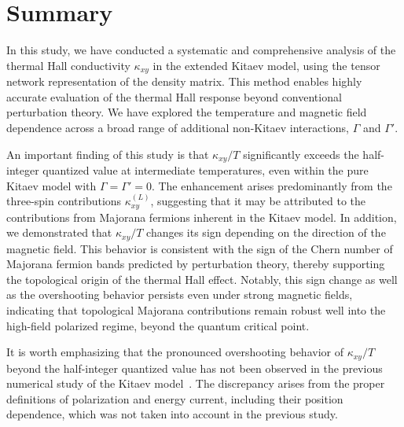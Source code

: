 \documentclass[twocolumn,superscriptaddress,showpacs, longbibliography, aps, prx]{revtex4-2}
\begin{document}
\section{Summary}
\label{sec:Summary}
In this study, we have conducted a systematic and comprehensive analysis of the thermal Hall conductivity $\kappa_{xy}$ in the extended Kitaev model, using the tensor network representation of the density matrix. 
This method enables highly accurate evaluation of the thermal Hall response beyond conventional perturbation theory. 
We have explored the temperature and magnetic field dependence across a broad range of additional non-Kitaev interactions, $\Gamma$ and $\Gamma'$. 

An important finding of this study is that $\kappa_{xy}/T$ significantly exceeds the half-integer quantized value at intermediate temperatures, even within the pure Kitaev model with $\Gamma=\Gamma'=0$. 
The enhancement arises predominantly from the three-spin contributions $\kappa_{xy}^{(L)}$, suggesting that it may be attributed to the contributions from Majorana fermions inherent in the Kitaev model. 
In addition, we demonstrated that $\kappa_{xy}/T$ changes its sign depending on the direction of the magnetic field. 
This behavior is consistent with the sign of the Chern number of Majorana fermion bands predicted by perturbation theory, thereby supporting the topological origin of the thermal Hall effect. 
Notably, this sign change as well as the overshooting behavior persists even under strong magnetic fields, indicating that topological Majorana contributions remain robust well into the high-field polarized regime, beyond the quantum critical point. 

It is worth emphasizing that the pronounced overshooting behavior of $\kappa_{xy}/T$ beyond the half-integer quantized value has not been observed in the previous numerical study of the Kitaev model~\cite{KumarT2023}. 
The discrepancy arises from the proper definitions of polarization and energy current, including their position dependence, which was not taken into account in the previous study. 
\end{document}
